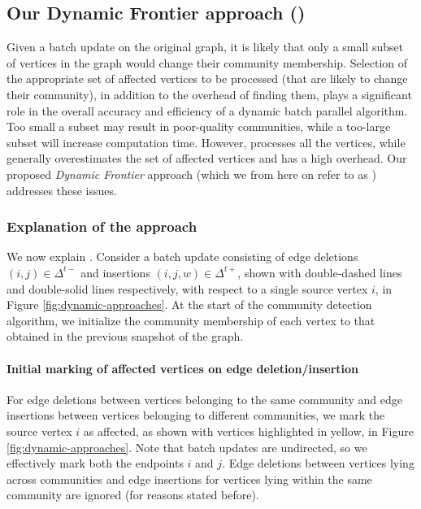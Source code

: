 \subsection{Our Dynamic Frontier approach (\Fro{})}
\label{sec:frontier}




Given a batch update on the original graph, it is likely that only a small subset of vertices in the graph would change their community membership. Selection of the appropriate set of affected vertices to be processed (that are likely to change their community), in addition to the overhead of finding them, plays a significant role in the overall accuracy and efficiency of a dynamic batch parallel algorithm. Too small a subset may result in poor-quality communities, while a too-large subset will increase computation time. However, \Nai{} processes all the vertices, while \Del{} generally overestimates the set of affected vertices and has a high overhead. Our proposed \textit{Dynamic Frontier} approach (which we from here on refer to as \Fro{}) addresses these issues.


\subsubsection{Explanation of the approach}

We now explain \Fro{}. Consider a batch update consisting of edge deletions $(i, j) \in \Delta^{t-}$ and insertions $(i, j, w) \in \Delta^{t+}$, shown with double-dashed lines and double-solid lines respectively, with respect to a single source vertex $i$, in Figure \ref{fig:dynamic-approaches}. At the start of the community detection algorithm, we initialize the community membership of each vertex to that obtained in the previous snapshot of the graph.

\paragraph{Initial marking of affected vertices on edge deletion/insertion}

For edge deletions between vertices belonging to the same community and edge insertions between vertices belonging to different communities, we mark the source vertex $i$ as affected, as shown with vertices highlighted in yellow, in Figure \ref{fig:dynamic-approaches}. Note that batch updates are undirected, so we effectively mark both the endpoints $i$ and $j$. Edge deletions between vertices lying across communities and edge insertions for vertices lying within the same community are ignored (for reasons stated before).

